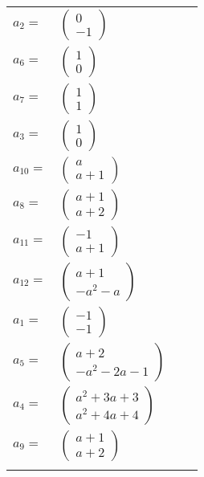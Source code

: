 \documentclass[1p]{elsarticle_modified}
\theoremstyle{definition}
\begin{document}
\begin{tabular}{m{7pt} m{180pt} m{7pt} m{180pt} }
\flushright $a_{2}=$&$\begin{pmatrix}0\\-1\end{pmatrix}$ \\
\flushright $a_{6}=$&$\begin{pmatrix}1\\0\end{pmatrix}$ \\
\flushright $a_{7}=$&$\begin{pmatrix}1\\1\end{pmatrix}$ \\
\flushright $a_{3}=$&$\begin{pmatrix}1\\0\end{pmatrix}$ \\
\flushright $a_{10}=$&$\begin{pmatrix}a\\a+1\end{pmatrix}$ \\
\flushright $a_{8}=$&$\begin{pmatrix}a+1\\a+2\end{pmatrix}$ \\
\flushright $a_{11}=$&$\begin{pmatrix}-1\\a+1\end{pmatrix}$ \\
\flushright $a_{12}=$&$\begin{pmatrix}a+1\\- a^2- a\end{pmatrix}$ \\
\flushright $a_{1}=$&$\begin{pmatrix}-1\\-1\end{pmatrix}$ \\
\flushright $a_{5}=$&$\begin{pmatrix}a+2\\- a^2-2 a-1\end{pmatrix}$ \\
\flushright $a_{4}=$&$\begin{pmatrix}a^2+3 a+3\\a^2+4 a+4\end{pmatrix}$ \\
\flushright $a_{9}=$&$\begin{pmatrix}a+1\\a+2\end{pmatrix}$\\&\end{tabular}
\end{document}
